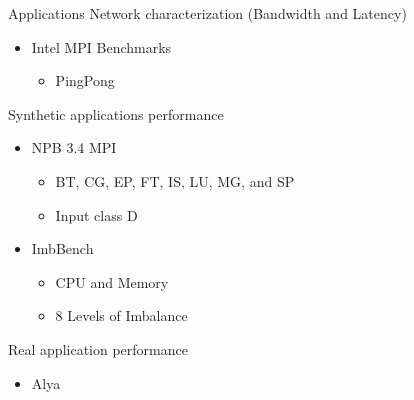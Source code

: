 \documentclass{beamer}
\begin{document}
\begin{frame}{Applications}
Network characterization (Bandwidth and Latency)
    \begin{itemize}
        \item Intel MPI Benchmarks 
        \begin{itemize}
            \item PingPong
        \end{itemize}
    \end{itemize}
    \pause \vfill
Synthetic applications performance
    \begin{itemize}
        \item NPB 3.4 MPI
        \begin{itemize}
            \item BT, CG, EP, FT, IS, LU, MG, and SP
            \item Input class D
        \pause \vfill
        \end{itemize}
        \item ImbBench 
        \begin{itemize}
            \item CPU and Memory
            \item 8 Levels of Imbalance
        \end{itemize}
        \end{itemize}
        \pause \vfill
Real application performance
    \begin{itemize}
        \item Alya
    \end{itemize}
\end{frame}
\end{document}
